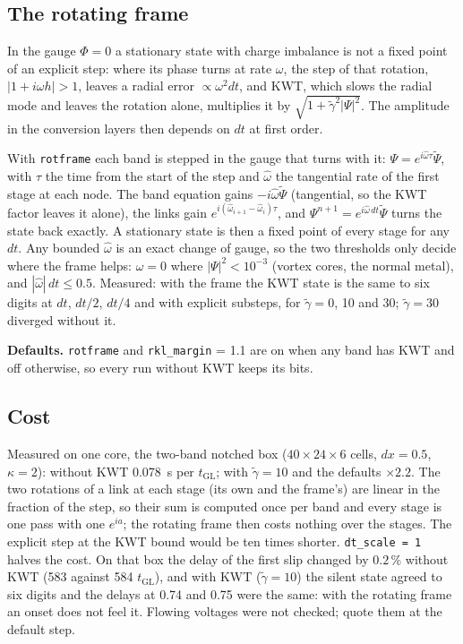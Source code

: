\documentclass[11pt,a4paper]{article}
\newcommand{\tGL}{t_{\mathrm{GL}}}
\newcommand{\code}[1]{\texttt{#1}}
\newcommand{\gt}{\tilde\gamma}
\begin{document}
\subsection{The rotating frame}

In the gauge $\Phi = 0$ a stationary state with charge imbalance is not a fixed point of an explicit step: where its
phase turns at rate $\omega$, the step of that rotation, $|1 + i\omega h| > 1$, leaves a radial error $\propto
\omega^2 dt$, and KWT, which slows the radial mode and leaves the rotation alone, multiplies it by
$\sqrt{1+\gt^2|\Psi|^2}$. The amplitude in the conversion layers then depends on $dt$ at first order.

With \code{rotframe} each band is stepped in the gauge that turns with it: $\Psi = e^{i\hat\omega\tau}\tilde\Psi$, with
$\tau$ the time from the start of the step and $\hat\omega$ the tangential rate of the first stage at each node. The
band equation gains $-i\hat\omega\tilde\Psi$ (tangential, so the KWT factor leaves it alone), the links gain
$e^{i(\hat\omega_{i+1}-\hat\omega_i)\tau}$, and $\Psi^{n+1} = e^{i\hat\omega\,dt}\tilde\Psi$ turns the state back
exactly. A stationary state is then a fixed point of every stage for any $dt$. Any bounded $\hat\omega$ is an exact change
of gauge, so the two thresholds only decide where the frame helps: $\hat\omega = 0$ where $|\Psi|^2 < 10^{-3}$ (vortex
cores, the normal metal), and $|\hat\omega|\,dt \le 0.5$. Measured: with the frame the KWT state is the same to six
digits at $dt$, $dt/2$, $dt/4$ and with explicit substeps, for $\gt = 0$, 10 and 30; $\gt = 30$ diverged without it.

\textbf{Defaults.} \code{rotframe} and \code{rkl\_margin} = 1.1 are on when any band has KWT and off otherwise, so every
run without KWT keeps its bits.

\subsection{Cost}

Measured on one core, the two-band notched box ($40\times24\times6$ cells, $dx = 0.5$, $\kappa = 2$): without KWT
0.078~s per $\tGL$; with $\gt = 10$ and the defaults $\times2.2$. The two rotations of a link at each stage (its own and
the frame's) are linear in the fraction of the step, so their sum is computed once per band and every stage is one pass
with one $e^{ia}$; the rotating frame then costs nothing over the stages. The explicit step at the KWT bound would be ten
times shorter.
\code{dt\_scale = 1} halves the cost. On that box the delay of the first slip changed by $0.2\,\%$ without KWT (583
against 584 $\tGL$), and with KWT ($\gt = 10$) the silent state agreed to six digits and the delays at 0.74 and 0.75 were
the same: with the rotating frame an onset does not feel it. Flowing voltages were not checked; quote them at the default
step.
\end{document}

